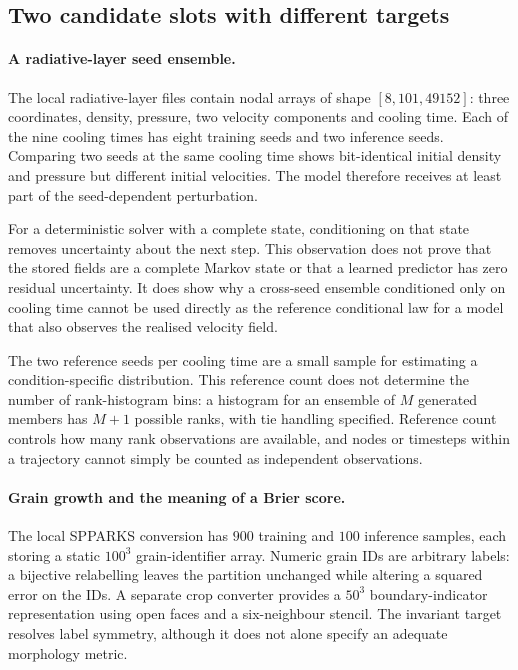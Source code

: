 \subsection{Two candidate slots with different targets}
\label{sec:bench:negative}

\paragraph{A radiative-layer seed ensemble.}
The local radiative-layer files contain nodal arrays of shape
$[8,101,49152]$: three coordinates, density, pressure, two velocity components
and cooling time. Each of the nine cooling times has eight training seeds and
two inference seeds. Comparing two seeds at the same cooling time shows
bit-identical initial density and pressure but different initial velocities.
The model therefore receives at least part of the seed-dependent perturbation.

For a deterministic solver with a complete state, conditioning on that state
removes uncertainty about the next step. This observation does not prove that
the stored fields are a complete Markov state or that a learned predictor has
zero residual uncertainty. It does show why a cross-seed ensemble conditioned
only on cooling time cannot be used directly as the reference conditional law
for a model that also observes the realised velocity field.

The two reference seeds per cooling time are a small sample for estimating a
condition-specific distribution. This reference count does not determine the
number of rank-histogram bins: a histogram for an ensemble of $M$ generated
members has $M+1$ possible ranks, with tie handling specified. Reference count
controls how many rank observations are available, and nodes or timesteps
within a trajectory cannot simply be counted as independent observations.

\paragraph{Grain growth and the meaning of a Brier score.}
The local SPPARKS conversion has $900$ training and $100$ inference samples,
each storing a static $100^3$ grain-identifier array. Numeric grain IDs are
arbitrary labels: a bijective relabelling leaves the partition unchanged
while altering a squared error on the IDs. A separate crop converter provides
a $50^3$ boundary-indicator representation using open faces and a
six-neighbour stencil. The invariant target resolves label symmetry, although
it does not alone specify an adequate morphology metric.

